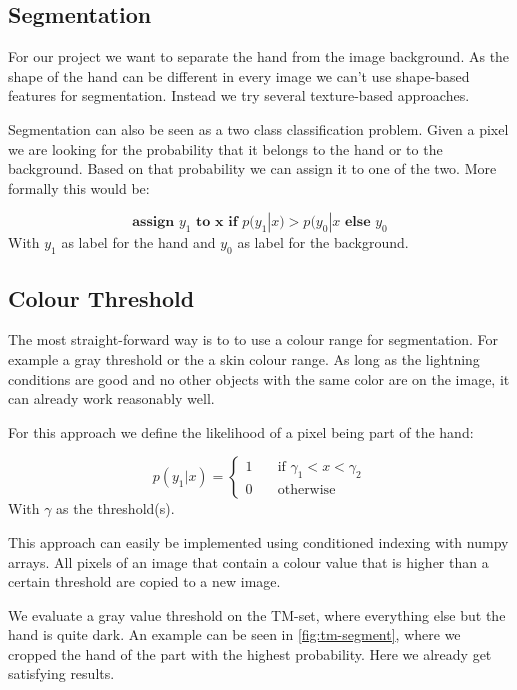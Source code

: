 \documentclass[letterpaper, 10 pt, conference]{ieeeconf}  %
\begin{document}
\subsection{Segmentation}

For our project we want to separate the hand from the image background. As the shape of the hand can be different in every image we can't use shape-based features for segmentation. Instead we try several texture-based approaches.

Segmentation can also be seen as a two class classification problem. Given a pixel we are looking for the probability that it belongs to the hand or to the background. Based on that probability we can assign it to one of the two. More formally this would be:

\begin{equation}
	\textbf{assign } y_1 \textbf{ to x if } p(y_1|x) > p(y_0|x \textbf{ else } y_0
\end{equation}
With $y_1$ as label for the hand and $y_0$ as label for the background. 

\subsection{Colour Threshold}

The most straight-forward way is to to use a colour range for segmentation. For example a gray threshold or the a skin colour range. As long as the lightning conditions are good and no other objects with the same color are on the image, it can already work reasonably well. 

For this approach we define the likelihood of a pixel being part of the hand:

\begin{equation}
p(y_1 | x) = \begin{cases}
1 & \quad \text{if } \gamma_1 < x < \gamma_2 \\
0 & \quad \text{otherwise}
\end{cases}
\end{equation}
With $\gamma$ as the threshold(s).

This approach can easily be implemented using conditioned indexing with numpy arrays. All pixels of an image that contain a colour value that is higher than a certain threshold are copied to a new image.

We evaluate a gray value threshold on the TM-set, where everything else but the hand is quite dark. An example can be seen in \autoref{fig:tm-segment}, where we cropped the hand of the part with the highest probability. Here we already get satisfying results.
\end{document}

